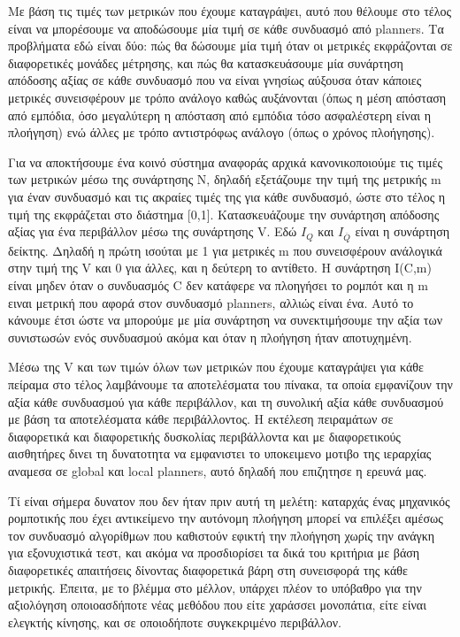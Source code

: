 \documentclass[a4paper,10pt]{article}
\begin{document}
Με βάση τις τιμές των μετρικών που έχουμε καταγράψει, αυτό που θέλουμε στο
τέλος είναι να μπορέσουμε να αποδώσουμε μία τιμή σε κάθε συνδυασμό από
planners.  Τα προβλήματα εδώ είναι δύο: πώς θα δώσουμε μία τιμή όταν οι
μετρικές εκφράζονται σε διαφορετικές μονάδες μέτρησης, και πώς θα
κατασκευάσουμε μία συνάρτηση απόδοσης αξίας σε κάθε συνδυασμό που να είναι
γνησίως αύξουσα όταν κάποιες μετρικές συνεισφέρουν με τρόπο ανάλογο καθώς
αυξάνονται (όπως η μέση απόσταση από εμπόδια, όσο μεγαλύτερη η απόσταση από
εμπόδια τόσο ασφαλέστερη είναι η πλοήγηση) ενώ άλλες με τρόπο αντιστρόφως
ανάλογο (όπως ο χρόνος πλοήγησης).

Για να αποκτήσουμε ένα κοινό σύστημα αναφοράς αρχικά κανονικοποιούμε τις τιμές
των μετρικών μέσω της συνάρτησης N, δηλαδή εξετάζουμε την τιμή της
μετρικής m για έναν συνδυασμό και τις ακραίες τιμές της για κάθε συνδυασμό,
ώστε στο τέλος η τιμή της εκφράζεται στο διάστημα [0,1]. Κατασκευάζουμε την
συνάρτηση απόδοσης αξίας για ένα περιβάλλον μέσω της συνάρτησης V. Εδώ $I_Q$ και
$I_\overline{Q}$ είναι η συνάρτηση δείκτης. Δηλαδή η πρώτη ισούται με 1 για
μετρικές m που συνεισφέρουν ανάλογικά στην τιμή της V και 0 για άλλες, και
η δεύτερη το αντίθετο.  Η συνάρτηση I(C,m) είναι μηδεν όταν ο συνδυασμός C
δεν κατάφερε να πλοηγήσει το ρομπότ και η m ειναι μετρική που αφορά στον
συνδυασμό planners, αλλιώς είναι ένα.  Αυτό το κάνουμε έτσι ώστε να μπορούμε με
μία συνάρτηση να συνεκτιμήσουμε την αξία των συνιστωσών ενός συνδυασμού ακόμα
και όταν η πλοήγηση ήταν αποτυχημένη.

Μέσω της V και των τιμών όλων των μετρικών που έχουμε καταγράψει για κάθε
πείραμα στο τέλος λαμβάνουμε τα αποτελέσματα του πίνακα, τα οποία εμφανίζουν
την αξία κάθε συνδυασμού για κάθε περιβάλλον, και τη συνολική αξία κάθε
συνδυασμού με βάση τα αποτελέσματα κάθε περιβάλλοντος. Η εκτέλεση πειραμάτων σε
διαφορετικά και διαφορετικής δυσκολίας περιβάλλοντα και με διαφορετικούς
αισθητήρες δινει τη δυνατοτητα να εμφανιστει το υποκειμενο μοτιβο της ιεραρχίας
αναμεσα σε global και local planners, αυτό δηλαδή που επιζητησε η ερευνά μας.

Τί είναι σήμερα δυνατον που δεν ήταν πριν αυτή τη μελέτη:
καταρχάς ένας μηχανικός ρομποτικής που έχει αντικείμενο την αυτόνομη πλοήγηση
μπορεί να επιλέξει αμέσως τον συνδυασμό αλγορίθμων που καθιστούν εφικτή
την πλοήγηση χωρίς την ανάγκη για εξονυχιστικά τεστ, και ακόμα να προσδιορίσει
τα δικά του κριτήρια με βάση διαφορετικές απαιτήσεις δίνοντας διαφορετικά βάρη
στη συνεισφορά της κάθε μετρικής. Έπειτα, με το βλέμμα στο μέλλον, υπάρχει
πλέον το υπόβαθρο για την αξιολόγηση οποιοασδήποτε νέας μεθόδου που είτε
χαράσσει μονοπάτια, είτε είναι ελεγκτής κίνησης, και σε οποιοδήποτε
συγκεκριμένο περιβάλλον.
\end{document}
